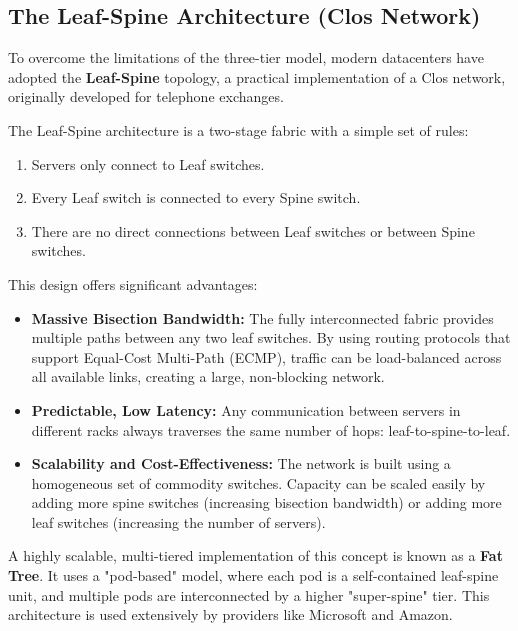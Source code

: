 \subsection{The Leaf-Spine Architecture (Clos Network)}
To overcome the limitations of the three-tier model, modern datacenters have adopted the \textbf{Leaf-Spine} topology, a practical implementation of a Clos network, originally developed for telephone exchanges.


The Leaf-Spine architecture is a two-stage fabric with a simple set of rules:
\begin{enumerate}
    \item Servers only connect to Leaf switches.
    \item Every Leaf switch is connected to every Spine switch.
    \item There are no direct connections between Leaf switches or between Spine switches.
\end{enumerate}

This design offers significant advantages:
\begin{itemize}
    \item \textbf{Massive Bisection Bandwidth:} The fully interconnected fabric provides multiple paths between any two leaf switches. By using routing protocols that support Equal-Cost Multi-Path (ECMP), traffic can be load-balanced across all available links, creating a large, non-blocking network.
    \item \textbf{Predictable, Low Latency:} Any communication between servers in different racks always traverses the same number of hops: leaf-to-spine-to-leaf.
    \item \textbf{Scalability and Cost-Effectiveness:} The network is built using a homogeneous set of commodity switches. Capacity can be scaled easily by adding more spine switches (increasing bisection bandwidth) or adding more leaf switches (increasing the number of servers).
\end{itemize}

A highly scalable, multi-tiered implementation of this concept is known as a \textbf{Fat Tree}. It uses a "pod-based" model, where each pod is a self-contained leaf-spine unit, and multiple pods are interconnected by a higher "super-spine" tier. This architecture is used extensively by providers like Microsoft and Amazon.

